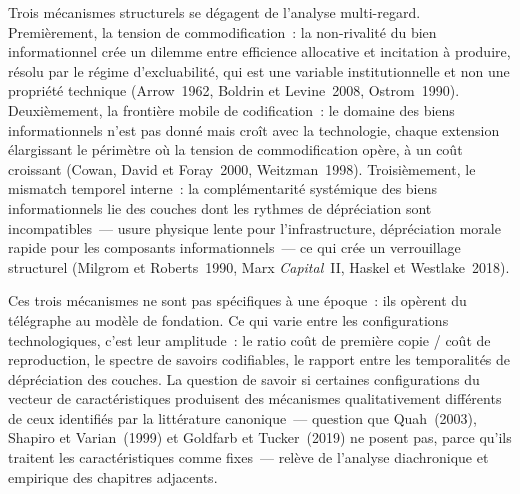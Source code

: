Trois mécanismes structurels se dégagent de l'analyse multi-regard. Premièrement, la tension de commodification~: la non-rivalité du bien informationnel crée un dilemme entre efficience allocative et incitation à produire, résolu par le régime d'excluabilité, qui est une variable institutionnelle et non une propriété technique (Arrow~1962, Boldrin et Levine~2008, Ostrom~1990). Deuxièmement, la frontière mobile de codification~: le domaine des biens informationnels n'est pas donné mais croît avec la technologie, chaque extension élargissant le périmètre où la tension de commodification opère, à un coût croissant (Cowan, David et Foray~2000, Weitzman~1998). Troisièmement, le mismatch temporel interne~: la complémentarité systémique des biens informationnels lie des couches dont les rythmes de dépréciation sont incompatibles~--- usure physique lente pour l'infrastructure, dépréciation morale rapide pour les composants informationnels~--- ce qui crée un verrouillage structurel (Milgrom et Roberts~1990, Marx \emph{Capital}~II, Haskel et Westlake~2018).

Ces trois mécanismes ne sont pas spécifiques à une époque~: ils opèrent du télégraphe au modèle de fondation. Ce qui varie entre les configurations technologiques, c'est leur amplitude~: le ratio coût de première copie / coût de reproduction, le spectre de savoirs codifiables, le rapport entre les temporalités de dépréciation des couches. La question de savoir si certaines configurations du vecteur de caractéristiques produisent des mécanismes qualitativement différents de ceux identifiés par la littérature canonique~--- question que Quah~(2003), Shapiro et Varian~(1999) et Goldfarb et Tucker~(2019) ne posent pas, parce qu'ils traitent les caractéristiques comme fixes~--- relève de l'analyse diachronique et empirique des chapitres adjacents.

